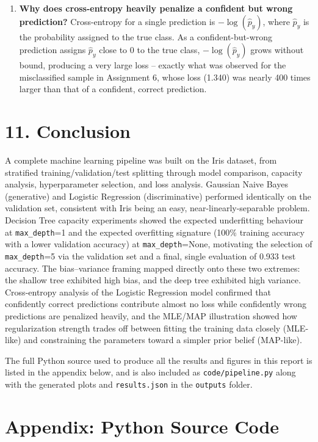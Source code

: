 \documentclass[12pt,a4paper]{article}
\begin{document}
\begin{enumerate}[leftmargin=1.6em]
\item \textbf{Why does cross-entropy heavily penalize a confident but wrong prediction?} Cross-entropy for a single prediction is $-\log(\hat{p}_y)$, where $\hat{p}_y$ is the probability assigned to the true class. As a confident-but-wrong prediction assigns $\hat{p}_y$ close to 0 to the true class, $-\log(\hat{p}_y)$ grows without bound, producing a very large loss -- exactly what was observed for the misclassified sample in Assignment 6, whose loss (1.340) was nearly 400 times larger than that of a confident, correct prediction.
\end{enumerate}

\section*{11. Conclusion}

A complete machine learning pipeline was built on the Iris dataset, from stratified training/validation/test splitting through model comparison, capacity analysis, hyperparameter selection, and loss analysis. Gaussian Naive Bayes (generative) and Logistic Regression (discriminative) performed identically on the validation set, consistent with Iris being an easy, near-linearly-separable problem. Decision Tree capacity experiments showed the expected underfitting behaviour at \texttt{max\_depth}=1 and the expected overfitting signature (100\% training accuracy with a lower validation accuracy) at \texttt{max\_depth}=None, motivating the selection of \texttt{max\_depth}=5 via the validation set and a final, single evaluation of 0.933 test accuracy. The bias--variance framing mapped directly onto these two extremes: the shallow tree exhibited high bias, and the deep tree exhibited high variance. Cross-entropy analysis of the Logistic Regression model confirmed that confidently correct predictions contribute almost no loss while confidently wrong predictions are penalized heavily, and the MLE/MAP illustration showed how regularization strength trades off between fitting the training data closely (MLE-like) and constraining the parameters toward a simpler prior belief (MAP-like).

The full Python source used to produce all the results and figures in this report is listed in the appendix below, and is also included as \texttt{code/pipeline.py} along with the generated plots and \texttt{results.json} in the \texttt{outputs} folder.

\section*{Appendix: Python Source Code}


\end{document}
